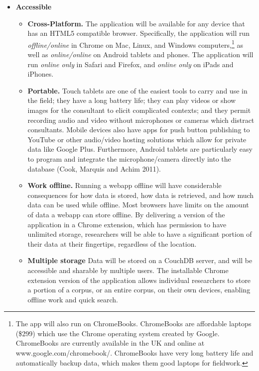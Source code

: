 \documentclass[12pt]{article}
\begin{document}
\begin{itemize}
\item{\bf Accessible}
\begin{itemize}
\item { \bf Cross-Platform.} The application will be available for any device that has an HTML5 compatible browser. Specifically, the application will run \emph{offline/online} in Chrome  on Mac, Linux, and Windows computers,\footnote{The app will also run on ChromeBooks. ChromeBooks are affordable laptops (\$299) which use the Chrome operating system created by Google. ChromeBooks are currently available in the UK and online at www.google.com/chromebook/. ChromeBooks have very long battery life and automatically backup data, which makes them good laptops for fieldwork.} as well as \emph{online/online} on Android tablets and phones. The application will run \emph{online only} in Safari and Firefox, and \emph{online only }on iPads and iPhones. 
\item  {\bf Portable.} Touch tablets are one of the easiest tools to carry and use in the field; they have a long battery life; they can play videos or show images for the consultant to elicit complicated contexts; and they permit recording audio and video without  microphones or cameras which distract consultants. Mobile devices also have apps for push button  publishing to YouTube or other audio/video hosting solutions  which  allow for private data like Google Plus. Furthermore, Android tablets are particularly easy to program and integrate the microphone/camera directly into the database (Cook, Marquis and Achim 2011).
\item {\bf Work offline.} Running a webapp offline will have considerable consequences for how data is stored, how data is retrieved, and how much data can be used while offline. Most browsers have limits on the amount of data a webapp can store offline. By delivering a version of the application in a Chrome extension, which has permission to have unlimited storage, researchers will be able to have a significant portion of their data at their fingertips, regardless of the location. 
\item {\bf Multiple storage} Data will be stored on a CouchDB server, and will be accessible and sharable by multiple users.  The installable Chrome extension version of the application allows individual researchers to store a portion of a corpus, or an entire corpus, on their own devices, enabling offline work and quick search. 
\end{itemize}




\end{itemize}
\end{document}
